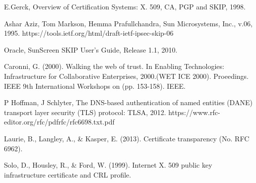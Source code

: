 \documentclass[journal, a4paper]{IEEEtran}
\begin{document}
\begin{thebibliography}{99}

 E.Gerck, Overview of Certification Systems: X. 509, CA, PGP and SKIP, 1998.

 Ashar Aziz, Tom Markson, Hemma Prafullchandra, Sun Microsystems, Inc., v.06, 1995. https://tools.ietf.org/html/draft-ietf-ipsec-skip-06

 Oracle, SunScreen SKIP User's Guide, Release 1.1, 2010. %

 Caronni, G. (2000). Walking the web of trust. In Enabling Technologies: Infrastructure for Collaborative Enterprises, 2000.(WET ICE 2000). Proeedings. IEEE 9th International Workshops on (pp. 153-158). IEEE. %

 P Hoffman, J Schlyter, The DNS-based authentication of named entities (DANE) transport layer security (TLS) protocol: TLSA, 2012. https://www.rfc-editor.org/rfc/pdfrfc/rfc6698.txt.pdf

 Laurie, B., Langley, A., \& Kasper, E. (2013). Certificate transparency (No. RFC 6962). %

 Solo, D., Housley, R., \& Ford, W. (1999). Internet X. 509 public key infrastructure certificate and CRL profile. %

\end{thebibliography}

\end{document}
